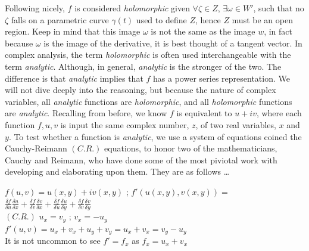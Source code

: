 \documentclass[a4paper,man,natbib]{apa6}
\begin{document}
Following nicely, $ f $ is considered \textit{holomorphic} given $ \forall \zeta \in Z $, $ \exists \omega \in W' $,
such that no $ \zeta $ falls on a parametric curve $ \gamma(t) $ used to define $ Z $, hence $ Z $ must be an open region.
Keep in mind that this image $ \omega $ is not the same as the image $ w $, in fact because $ \omega $ is the image of the derivative, it is best thought of a tangent vector.
In complex analysis, the term \textit{holomorphic} is often used interchangeable with the term \textit{analytic}.
Although, in general, \textit{analytic} is the stronger of the two.
The difference is that \textit{analytic} implies that $ f $ has a power series representation.
We will not dive deeply into the reasoning, but because the nature of complex variables,
all \textit{analytic} functions are \textit{holomorphic}, and all \textit{holomorphic} functions are \textit{analytic}.
Recalling from before, we know $ f $ is equivalent to $ u +iv $, where each function $ f,u,v $ is input the same complex number, $ z $, of two real variables, $ x $ and $ y $.
To test whether a function is \textit{analytic}, we use a system of equations coined the Cauchy-Reimann $ (C.R.) $ equations, to honor two of the mathematicians,
Cauchy and Reimann, who have done some of the most piviotal work with developing and elaborating upon them. They are as follows \dots

\begin{center}

      $ f(u,v) = u(x,y) +iv(x,y) $ ; $ f'(u(x,y),v(x,y)) = $$ \frac{\delta f}{\delta u} \frac{\delta u}{\delta x} + \frac{\delta f}{\delta v} \frac{\delta v}{\delta x} +
      \frac{\delta f}{\delta u} \frac{\delta u}{\delta y} + \frac{\delta f}{\delta v} \frac{\delta v}{\delta y} $
      \\
      $ (C.R.) $ $ u_{x} = v_{y} $ ; $ v_{x} = -u_{y} $
      \\
      $ f'(u,v) = u_{x} + v_{x} + u_{y} + v_{y} = u_{x} + v_{x} = v_{y} - u_{y} $
      \\
      It is not uncommon to see $ f' = f_{x} $ as $ f_{x} = u_{x} + v_{x} $

\end{center}
\end{document}
